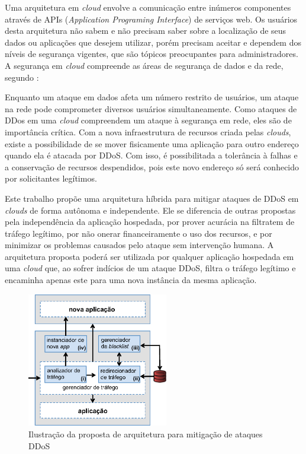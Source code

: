 

Uma arquitetura em \emph{cloud} envolve a comunicação entre inúmeros componentes através de APIs (\emph{Application Programing Interface}) de serviços web. Os usuários desta arquitetura não sabem e não precisam saber sobre a localização de seus dados ou aplicações que desejem utilizar, porém precisam aceitar e dependem  dos níveis de segurança vigentes, que são tópicos preocupantes para administradores.
A segurança em \emph{cloud} compreende as áreas de segurança de dados e da rede, segundo \cite{Dhage:2011:IDS:1980022.1980076}:  

Enquanto um ataque em dados afeta um número restrito de usuários, um ataque na rede pode comprometer diversos usuários simultaneamente. Como ataques de DDos em uma \emph{cloud} compreendem um ataque à segurança em rede, eles são de importância crítica.  
%
Com a nova infraestrutura de recursos criada pelas \emph{clouds}, existe a possibilidade de se mover fisicamente uma aplicação para outro endereço quando ela é atacada por DDoS. Com isso, é possibilitada a tolerância à falhas e a conservação de recursos despendidos, pois este novo endereço só será conhecido por solicitantes legítimos.

Este trabalho propõe uma arquitetura híbrida para mitigar ataques de DDoS em \emph{clouds} de forma autônoma e independente. Ele se diferencia de outras propostas pela independência da aplicação hospedada, por prover acurácia na filtratem de tráfego legítimo, por não onerar financeiramente o uso dos recursos, e por minimizar os problemas causados pelo ataque sem intervenção humana.
%
A arquitetura proposta poderá ser utilizada por qualquer aplicação hospedada em uma \emph{cloud} que, ao sofrer indícios de um ataque DDoS, filtra o tráfego legítimo e encaminha apenas este para uma nova instância da mesma aplicação. 


\begin{figure}[h!]
\centering
\includegraphics[width=0.55\textwidth]{arq.eps}
\caption{Ilustração da proposta de arquitetura para mitigação de ataques DDoS}
\label{fig:arq}
\end{figure}

